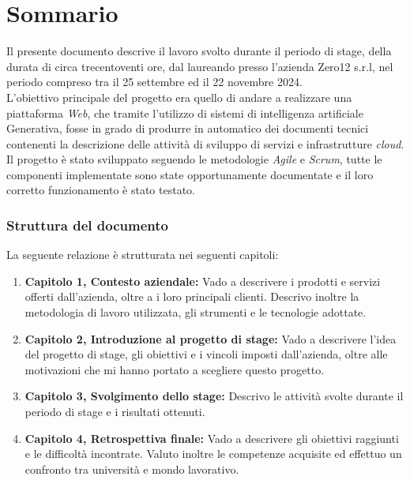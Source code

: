 \cleardoublepage
{}
{}
\begingroup
\let\clearpage\relax
\let\cleardoublepage\relax
\let\cleardoublepage\relax

\chapter*{Sommario}

Il presente documento descrive il lavoro svolto durante il periodo di stage, della durata di circa trecentoventi ore, dal laureando \myName presso l'azienda Zero12 s.r.l, 
nel periodo compreso tra il 25 settembre ed il 22 novembre 2024. \\
L'obiettivo principale del progetto era quello di andare a realizzare una piattaforma \textit{Web}, che tramite l'utilizzo di sistemi di intelligenza artificiale Generativa, 
fosse in grado di produrre in automatico dei documenti tecnici contenenti la descrizione delle attività di sviluppo di servizi e infrastrutture \textit{cloud}. \\
Il progetto è stato sviluppato seguendo le metodologie \textit{Agile} e \textit{Scrum}, tutte le componenti implementate sono state opportunamente documentate e 
il loro corretto funzionamento è stato testato.\\ 

\subsection*{Struttura del documento}
La seguente relazione è strutturata nei seguenti capitoli:
\begin{enumerate}
    \item \textbf{Capitolo 1, Contesto aziendale:}  Vado a descrivere i prodotti e servizi offerti dall'azienda, oltre a i loro principali clienti.
        Descrivo inoltre la metodologia di lavoro utilizzata, gli strumenti e le tecnologie adottate.
    \item \textbf{Capitolo 2, Introduzione al progetto di stage:} Vado a descrivere l'idea del progetto di stage, gli obiettivi e i vincoli imposti dall'azienda, oltre alle motivazioni che mi hanno portato a scegliere questo progetto.
    \item \textbf{Capitolo 3, Svolgimento dello stage:} Descrivo le attività svolte durante il periodo di stage e i risultati ottenuti.
    \item \textbf{Capitolo 4, Retrospettiva finale:} Vado a descrivere gli obiettivi raggiunti e le difficoltà incontrate.
    Valuto inoltre le competenze acquisite ed effettuo un confronto tra università e mondo lavorativo.
\end{enumerate}

